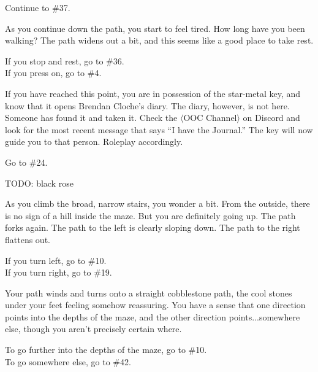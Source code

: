 \documentclass[green]{gl2018}
\begin{document}
\begin{large}
\begin{location}{19}
\begin{fromhere}  Continue to \#37.\end{fromhere}
\end{location}
\begin{location}{20}
As you continue down the path, you start to feel tired. How long have you been walking? The path widens out a bit, and this seems like a good place to take rest.
\begin{fromhere} If you stop and rest, go to \#36.\\
 If you press on, go to \#4.
\end{fromhere}
\end{location}
\begin{location}{21}
If you have reached this point, you are in possession of the star-metal key, and know that it opens Brendan Cloche's diary. The diary, however, is not here. Someone has found it and taken it. Check the $\langle$OOC Channel$\rangle$ on Discord and look for the most recent message that says “I have the Journal.” The key will now guide you to that person.  Roleplay accordingly. 
\begin{fromhere}Go to \#24.\end{fromhere}
\end{location}
\begin{location}{22}
TODO: black rose
\end{location}
\begin{location}{23}
As you climb the broad, narrow stairs, you wonder a bit. From the outside, there is no sign of a hill inside the maze. But you are definitely going up. The path forks again. The path to the left is clearly sloping down. The path to the right flattens out.
\begin{fromhere} If you turn left, go to \#10.\\ If you turn right,  go to \#19.\end{fromhere}
\end{location}
\begin{location}{24}
Your path winds and turns onto a straight cobblestone path, the cool stones under your feet feeling somehow reassuring.  You have a sense that one direction points into the depths of the maze, and the other direction points...somewhere else, though you aren't precisely certain where.  
\begin{fromhere}To go further into the depths of the maze, go to \#10.\\  To go somewhere else, go to \#42.\end{fromhere}

\end{location}
\end{large}
\end{document}

